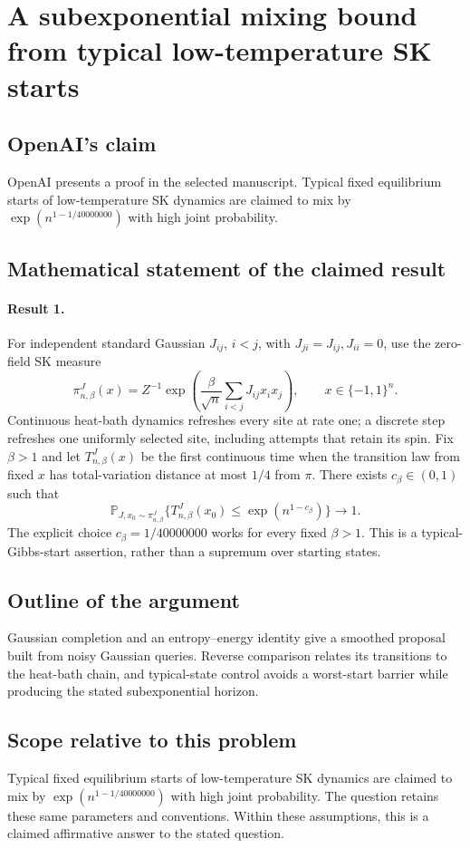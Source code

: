 \documentclass[11pt]{article}
\begin{document}
\section*{A subexponential mixing bound from typical low-temperature SK starts}

\subsection{OpenAI's claim}
OpenAI presents a proof in the selected manuscript. Typical fixed equilibrium starts of low-temperature SK dynamics are claimed to mix by $\exp(n^{1-1/40000000})$ with high joint probability.

\subsection{Mathematical statement of the claimed result}
\paragraph{Result 1.} For independent standard Gaussian $J_{ij}$, $i<j$, with $J_{ji}=J_{ij},J_{ii}=0$, use the zero-field SK measure
\[
 \pi_{n,\beta}^J(x)=Z^{-1}\exp\left(\frac\beta{\sqrt n}\sum_{i<j}J_{ij}x_ix_j\right),\qquad x\in\{-1,1\}^n.
\]
Continuous heat-bath dynamics refreshes every site at rate one; a discrete step refreshes one uniformly selected site, including attempts that retain its spin. Fix $\beta>1$ and let $T_{n,\beta}^J(x)$ be the first continuous time when the transition law from fixed $x$ has total-variation distance at most $1/4$ from $\pi$. There exists $c_\beta\in(0,1)$ such that
\[
 \mathbb P_{J,x_0\sim\pi_{n,\beta}^J}
 \{T_{n,\beta}^J(x_0)\le\exp(n^{1-c_\beta})\}\longrightarrow1.
\]
The explicit choice $c_\beta=1/40000000$ works for every fixed $\beta>1$. This is a typical-Gibbs-start assertion, rather than a supremum over starting states.

\subsection{Outline of the argument}
Gaussian completion and an entropy--energy identity give a smoothed proposal built from noisy Gaussian queries. Reverse comparison relates its transitions to the heat-bath chain, and typical-state control avoids a worst-start barrier while producing the stated subexponential horizon.

\subsection{Scope relative to this problem}
Typical fixed equilibrium starts of low-temperature SK dynamics are claimed to mix by $\exp(n^{1-1/40000000})$ with high joint probability. The question retains these same parameters and conventions. Within these assumptions, this is a claimed affirmative answer to the stated question.
\end{document}
